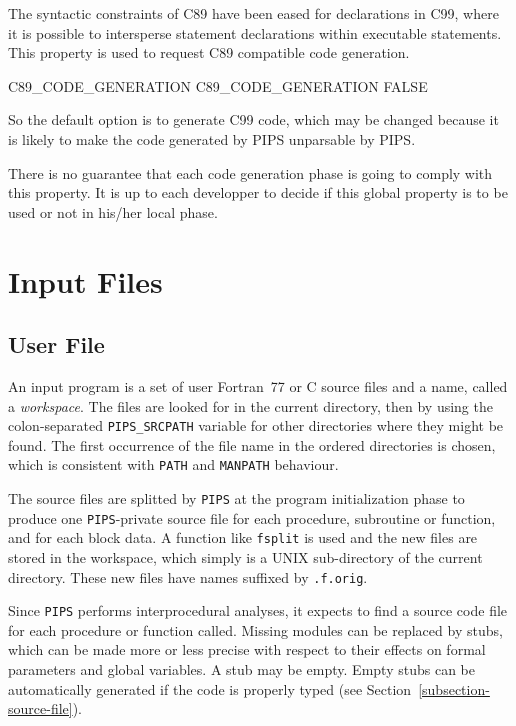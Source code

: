 \documentclass[a4paper]{report}
\newcommand{\Pips}{\texttt{PIPS}}
\begin{document}
The syntactic constraints of C89 have been eased for declarations in
C99, where it is possible to intersperse statement declarations within
executable statements. This property is used to request C89 compatible
code generation.

\begin{PipsProp}{C89_CODE_GENERATION}
C89_CODE_GENERATION FALSE
\end{PipsProp}

So the default option is to generate C99 code, which may be changed
because it is likely to make the code generated by PIPS unparsable by PIPS.

There is no guarantee that each code generation phase is going to
comply with this property. It is up to each developper to decide if
this global property is to be used or not in his/her local phase.




\chapter{Input Files}
\label{section-input-files}

\section{User File}
\label{subsection-user-file}

An input program is a set of user Fortran~77 or C source files and a name,
called a {\em workspace}. The files are looked for in the current
directory, then by using the colon-separated \verb|PIPS_SRCPATH| variable
for other directories where they might be found. The first occurrence of
the file name in the ordered directories is chosen, which is consistent
with \texttt{PATH} and \texttt{MANPATH} behaviour.

The source files are splitted by \Pips{} at the
program initialization phase to produce one \Pips{}-private source file
for each procedure, subroutine or function, and for each block data. A
function like \verb+fsplit+ is used and the new files are stored in the
workspace, which simply is a UNIX sub-directory of the current directory.
These new files have names suffixed by {\tt .f.orig}.

Since \Pips{} performs interprocedural analyses, it expects to find a
source code file for each procedure or function called. Missing modules
can be replaced by stubs, which can be made more or less precise with
respect to their effects on formal parameters and global variables. A
stub may be empty. Empty stubs can be automatically generated if the code
is properly typed (see Section~\ref{subsection-source-file}).
\end{document}
